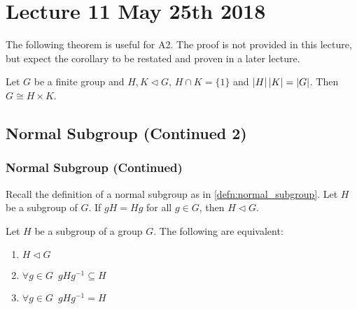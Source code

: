 \chapter{Lecture 11 May 25th 2018}%
\label{chp:lecture_11_may_25th_2018}

The following theorem is useful for A2. The proof is not provided in this lecture, but expect the corollary to be restated and proven in a later lecture.

\begin{crlynonum}
  Let $G$ be a finite group and $H, K \triangleleft G$, $H \cap K = \{1\}$ and $\left|H\right| \left|K\right| = \left|G\right|$. Then $G \cong H \times K$.
\end{crlynonum}

\section{Normal Subgroup (Continued 2)}%
\label{sec:normal_subgroup_continued_2}

\subsection{Normal Subgroup (Continued)}%
\label{sub:normal_subgroup_continued}

\begin{note}[Recall]
  Recall the definition of a normal subgroup as in \cref{defn:normal_subgroup}. Let $H$ be a subgroup of $G$. If $gH = Hg$ for all $g \in G$, then $H \triangleleft G$.
\end{note}

\begin{propo}
\label{propo:normality_test}
  Let $H$ be a subgroup of a group $G$. The following are equivalent:
  \begin{enumerate}
    \item $H \triangleleft G$
    \item $\forall g \in G \enspace gHg^{-1} \subseteq H$
    \item $\forall g \in G \enspace gHg^{-1} = H$
  \end{enumerate}
\end{propo}

